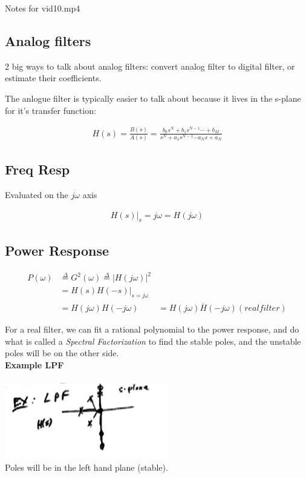 Notes for vid10.mp4

\subsection*{Analog filters}

2 big ways to talk about analog filters: convert analog filter to
digital filter, or estimate their coefficients. 

The anlogue filter is typically easier to talk about because it lives
in the s-plane for it's transfer function:

\begin{align*}
    H(s) = \frac{B(s)}{A(s)} = 
    \frac{
        b_0 s^N + b_1 s^{N-1} \cdots + b_M
    } {
        s^N + a_1 s^{N-1} \cdots a_N s + a_N
    }
\end{align*}

\subsection*{Freq Resp}

Evaluated on the $j\omega$ axis

\begin{align*}
    H(s) \vert_s=j\omega = H(j\omega)
\end{align*}

\subsection*{Power Response}

\begin{align*}
    P(\omega) 
    &\stackrel{\Delta}{=} G^2(\omega) 
    \stackrel{\Delta}{=}
    \vert H(j \omega) \vert^2 \\
    &= H(s)H(-s)\vert_{s=j\omega} \\
    &= H(j \omega)H(-j\omega) 
    &= \overline{H(j \omega)H(-j\omega)} (real filter)
\end{align*}

For a real filter, we can fit a rational polynomial to the power response, 
and do what is called a \textit{Spectral Factorization} to find the
stable poles, and the unstable poles will be on the other side.\\

\textbf{Example LPF}\\

\\
\includegraphics[scale=0.5]{frames/14a}\\
Poles will be in the left hand plane (stable). 

